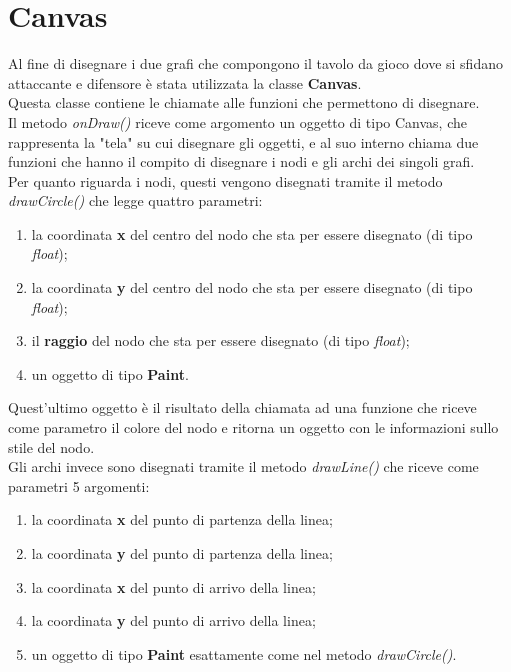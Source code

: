 \documentclass[a4paper,12pt,twoside,openright]{report}
\begin{document}
\section{Canvas}
Al fine di disegnare i due grafi che compongono il tavolo da gioco dove si sfidano attaccante e difensore è stata utilizzata la classe \textbf{Canvas}.\\
Questa classe contiene le chiamate alle funzioni che permettono di disegnare.\\
Il metodo \textit{onDraw()} riceve come argomento un oggetto di tipo Canvas, che rappresenta la "tela" su cui disegnare gli oggetti, e al suo interno chiama due funzioni che hanno il compito di disegnare i nodi e gli archi dei singoli grafi.\\
Per quanto riguarda i nodi, questi vengono disegnati tramite il metodo \textit{drawCircle()} che legge quattro parametri:

\begin{enumerate}
\item la coordinata \textbf{x} del centro del nodo che sta per essere disegnato (di tipo \textit{float});

\item la coordinata \textbf{y} del centro del nodo che sta per essere disegnato (di tipo \textit{float});

\item il \textbf{raggio} del nodo che sta per essere disegnato (di tipo \textit{float});

\item un oggetto di tipo \textbf{Paint}.
\end{enumerate}

Quest'ultimo oggetto è il risultato della chiamata ad una funzione che riceve come parametro il colore del nodo e ritorna un oggetto con le informazioni sullo stile del nodo.\\ 
Gli archi invece sono disegnati tramite il metodo \textit{drawLine()} che riceve come parametri 5 argomenti:

\begin{enumerate}
\item la coordinata \textbf{x} del punto di partenza della linea;

\item la coordinata \textbf{y} del punto di partenza della linea;

\item la coordinata \textbf{x} del punto di arrivo della linea;

\item la coordinata \textbf{y} del punto di arrivo della linea;

\item un oggetto di tipo \textbf{Paint} esattamente come nel metodo \textit{drawCircle()}.
\end{enumerate}
\end{document}
